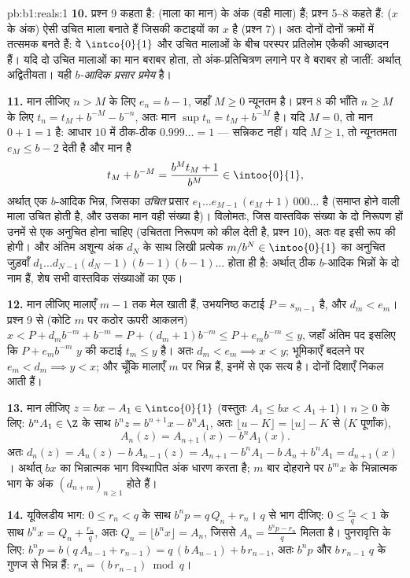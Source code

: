 \begin{solution}{pb:b1:reals:1}
\textbf{10.} प्रश्न 9 कहता है: (माला का मान) के अंक (वही माला) हैं; प्रश्न
5--8 कहते हैं: ($x$ के अंक) ऐसी उचित माला बनाते हैं जिसकी कटाइयों का 
$x$ है (प्रश्न 7)। अतः दोनों  दोनों क्रमों में तत्समक बनते हैं:
वे $\intco{0}{1}$ और उचित मालाओं के बीच परस्पर प्रतिलोम एकैकी आच्छादन हैं।
यदि दो उचित मालाओं का मान बराबर होता, तो अंक-प्रतिचित्रण लगाने पर वे बराबर
हो जातीं: अर्थात् अद्वितीयता। यही \emph{$b$-आदिक प्रसार प्रमेय} है।

\textbf{11.} मान लीजिए $n > M$ के लिए $e_n = b - 1$, जहाँ $M \geq 0$ न्यूनतम
है। प्रश्न 8 की भाँति $n \geq M$ के लिए $t_n = t_M + b^{-M} - b^{-n}$, अतः
मान $\sup t_n = t_M + b^{-M}$ है। यदि $M = 0$, तो मान $0 + 1 = 1$ है: आधार
$10$ में ठीक-ठीक $0.999\dots = 1$ --- सन्निकट नहीं। यदि $M \geq 1$, तो
न्यूनतमता $e_M \leq b - 2$ देती है और मान है
\[
t_M + b^{-M} = \frac{b^M t_M + 1}{b^M} \in \intoo{0}{1},
\]
अर्थात् एक $b$-आदिक भिन्न, जिसका \emph{उचित} प्रसार $e_1 \dots e_{M-1}\,(e_M
+ 1)\,000\dots$ है (समाप्त होने वाली माला उचित होती है, और उसका मान वही
संख्या है)। विलोमतः, जिस वास्तविक संख्या के दो निरूपण हों उनमें से एक अनुचित
होना चाहिए (उचितता निरूपण को कील देती है, प्रश्न 10), अतः वह इसी रूप की
होगी। और अंतिम अशून्य अंक $d_N$ के साथ लिखी प्रत्येक $m/b^N \in
\intoo{0}{1}$ का अनुचित जुड़वाँ $d_1 \dots d_{N-1}(d_N - 1)(b-1)(b-1)\dots$
होता ही है: अर्थात् ठीक $b$-आदिक भिन्नों के दो नाम हैं, शेष सभी वास्तविक
संख्याओं का एक।

\textbf{12.} मान लीजिए मालाएँ $m - 1$ तक मेल खाती हैं, उभयनिष्ठ कटाई $P =
s_{m-1}$ है, और $d_m < e_m$। प्रश्न 9 से (कोटि $m$ पर कठोर ऊपरी आकलन) $x < P
+ d_m b^{-m} + b^{-m} = P + (d_m + 1)b^{-m} \leq P + e_m b^{-m} \leq y$,
जहाँ अंतिम पद इसलिए कि $P + e_m b^{-m}$ $y$ की कटाई $t_m \leq y$ है। अतः
$d_m < e_m \implies x < y$; भूमिकाएँ बदलने पर $e_m < d_m \implies y < x$; और
चूँकि मालाएँ $m$ पर भिन्न हैं, इनमें से एक सत्य है। दोनों दिशाएँ निकल आती
हैं।

\textbf{13.} मान लीजिए $z = bx - A_1 \in \intco{0}{1}$ (वस्तुतः $A_1 \leq bx
< A_1 + 1$)। $n \geq 0$ के लिए: $b^n A_1 \in \Z$ के साथ $b^n z = b^{n+1} x -
b^n A_1$, अतः $\lfloor u - K \rfloor = \lfloor u \rfloor - K$ से ($K$
पूर्णांक),
\[
A_n(z) = A_{n+1}(x) - b^n A_1(x) .
\]
अतः $d_n(z) = A_n(z) - b\,A_{n-1}(z) = A_{n+1} - b^n A_1 - b\,A_n + b^n A_1
= d_{n+1}(x)$। अर्थात् $bx$ का भिन्नात्मक भाग विस्थापित अंक धारण करता है;
$m$ बार दोहराने पर $b^m x$ के भिन्नात्मक भाग के अंक $(d_{n+m})_{n \geq 1}$
होते हैं।

\textbf{14.} यूक्लिडीय भाग: $0 \leq r_n < q$ के साथ $b^n p = q\,Q_n + r_n$।
$q$ से भाग दीजिए: $0 \leq \frac{r_n}{q} < 1$ के साथ $b^n x = Q_n +
\frac{r_n}{q}$, अतः $Q_n = \lfloor b^n x \rfloor = A_n$, जिससे $A_n =
\frac{b^n p - r_n}{q}$ मिलता है। पुनरावृत्ति के लिए: $b^n p = b(q\,A_{n-1} +
r_{n-1}) = q\,(b\,A_{n-1}) + b\,r_{n-1}$, अतः $b^n p$ और $b\,r_{n-1}$ $q$ के
गुणज से भिन्न हैं: $r_n = (b\,r_{n-1}) \bmod q$।


\end{solution}
